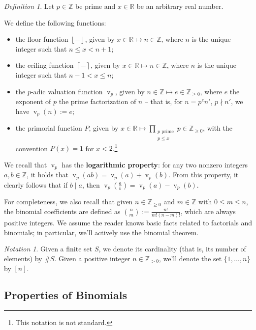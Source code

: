 \documentclass[11pt]{article}
\theoremstyle{remark}
\newtheorem{definition}[theorem]{Definition}
\newtheorem{notation}[theorem]{Notation}
\newcommand{\floor}[1]{\left\lfloor #1 \right\rfloor}
\newcommand{\ceil}[1]{\left\lceil #1 \right\rceil}
\newcommand{\vs}{\vspace{10px}}
\DeclareMathOperator{\val}{v}
\DeclareMathOperator{\vv}{v}
\begin{document}
\begin{definition}
    Let $p\in \mathbb Z$ be prime and $x\in \mathbb R$ be an arbitrary real number.
    
    We define the following functions:
    \begin{itemize}
        \item the floor function $\floor{-}$, given by $x\in \mathbb R\mapsto n\in \mathbb Z$, where $n$ is the unique integer such that $n\le x<n+1$;
          \item the ceiling function $\ceil{-}$, given by $x\in \mathbb R\mapsto n\in \mathbb Z$, where $n$ is the unique integer such that $n-1<x\le n$;
        \item the $p$-adic valuation function $\val_p$, given by $n\in \mathbb Z\mapsto e\in\mathbb Z_{\ge 0}$, where $e$ the exponent of $p$ the prime factorization of $n$ -- that is, for $n=p^e n'$, $p\nmid n'$, we have $\val_p(n):= e$;
        \item the primorial function $P$, given by $x\in \mathbb R \mapsto \prod\limits_{\substack{p\text{ prime} \\ p\le x}}p\in \mathbb Z_{\ge 0}$, with the convention $P(x)=1$ for $x<2$.\footnote{This notation is not standard.}
    \end{itemize}
\end{definition}

We recall that $\vv_p$ has the \textbf{logarithmic property}: for any two nonzero integers $a,b\in \mathbb Z$, it holds that $\vv_p(ab) = \vv_p(a)+\vv_p(b)$. From this property, it clearly follows that if $b\mid a$, then $\val_p(\frac{a}{b})= \val_p(a)-\val_p(b)$.\vs

For completeness, we also recall that given $n\in \mathbb Z_{\ge 0}$ and $m\in \mathbb Z$ with $0\le m\le n$, the binomial coefficients are defined as $\binom{n}{m}:= \frac{n!}{m!(n-m)!}$, which are always positive integers. We assume the reader knows basic facts related to factorials and binomials; in particular, we'll actively use the binomial theorem.
\vs

\begin{notation}
    Given a finite set $S$, we denote its cardinality (that is, its number of elements) by $\#S$.  Given a positive integer $n\in\mathbb Z_{>0}$, we'll denote the set $\{1,\ldots, n\}$ by $[n]$. 
\end{notation}

\vs
\subsection{Properties of Binomials}
\end{document}
